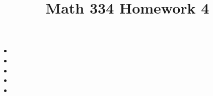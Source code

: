 \documentclass{article}
\title{Math 334 Homework 4}
\begin{document}
\maketitle
\begin{itemize}[label=]
	\item 
	\item 
	\item 
	\item 
	\item 
\end{itemize}
\end{document}
